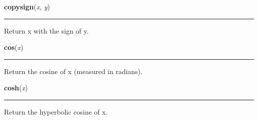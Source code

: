     \label{math:copysign}

    \vspace{0.5ex}

\hspace{.8\funcindent}\begin{boxedminipage}{\funcwidth}

    \raggedright \textbf{copysign}(\textit{x}, \textit{y})

    \vspace{-1.5ex}

    \rule{\textwidth}{0.5\fboxrule}
\setlength{\parskip}{2ex}
    Return x with the sign of y.

\setlength{\parskip}{1ex}
    \end{boxedminipage}

    \label{math:cos}

    \vspace{0.5ex}

\hspace{.8\funcindent}\begin{boxedminipage}{\funcwidth}

    \raggedright \textbf{cos}(\textit{x})

    \vspace{-1.5ex}

    \rule{\textwidth}{0.5\fboxrule}
\setlength{\parskip}{2ex}
    Return the cosine of x (measured in radians).

\setlength{\parskip}{1ex}
    \end{boxedminipage}

    \label{math:cosh}

    \vspace{0.5ex}

\hspace{.8\funcindent}\begin{boxedminipage}{\funcwidth}

    \raggedright \textbf{cosh}(\textit{x})

    \vspace{-1.5ex}

    \rule{\textwidth}{0.5\fboxrule}
\setlength{\parskip}{2ex}
    Return the hyperbolic cosine of x.

\setlength{\parskip}{1ex}
    \end{boxedminipage}

    \label{math:degrees}

